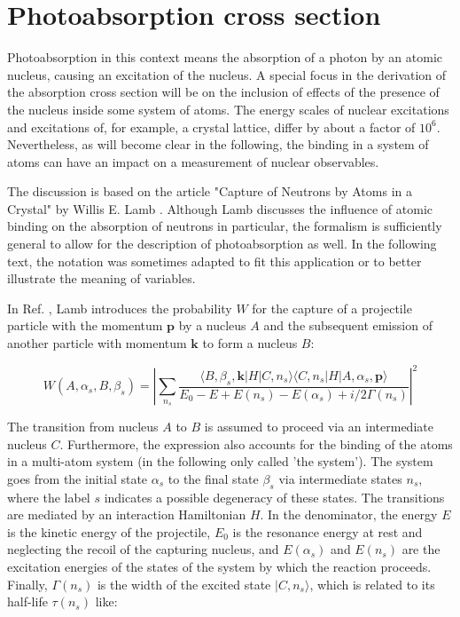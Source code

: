 \documentclass{article}
\begin{document}
\section{Photoabsorption cross section}
Photoabsorption in this context means the absorption of a photon by an atomic nucleus, causing an excitation of the nucleus. A special focus in the derivation of the absorption cross section will be on the inclusion of effects of the presence of the nucleus inside some system of atoms. The energy scales of nuclear excitations and excitations of, for example, a crystal lattice, differ by about a factor of $10^6$. Nevertheless, as will become clear in the following, the binding in a system of atoms can have an impact on a measurement of nuclear observables.

The discussion is based on the article "Capture of Neutrons by Atoms in a Crystal" by Willis E. Lamb \cite{Lam39}. 
Although Lamb discusses the influence of atomic binding on the absorption of neutrons in particular, the formalism is sufficiently general to allow for the description of photoabsorption as well. In the following text, the notation was sometimes adapted to fit this application or to better illustrate the meaning of variables.

In Ref. \cite{Lam39}, Lamb introduces the probability $W$ for the capture of a projectile particle with the momentum $\mathbf{p}$ by a nucleus $A$ and the subsequent emission of another particle with momentum $\mathbf{k}$ to form a nucleus $B$:

\begin{equation}
\label{absorption_general}
W(A, \alpha_s, B, \beta_s) = \left| \sum_{n_s} \frac{\langle B, \beta_s, \mathbf{k} | H | C, n_s \rangle \langle C, n_s | H | A, \alpha_s, \mathbf{p} \rangle }{E_0 - E + E(n_s) - E(\alpha_s) + i/2 \Gamma(n_s)} \right| ^2
\end{equation}

The transition from nucleus $A$ to $B$ is assumed to proceed via an intermediate nucleus $C$. 
Furthermore, the expression also accounts for the binding of the atoms in a multi-atom system (in the following only called 'the system'). 
The system goes from the initial state $\alpha_s$ to the final state $\beta_s$ via intermediate states $n_s$, where the label $s$ indicates a possible degeneracy of these states. 
The transitions are mediated by an interaction Hamiltonian $H$.
In the denominator, the energy $E$ is the kinetic energy of the projectile, $E_0$ is the resonance energy at rest and neglecting the recoil of the capturing nucleus, and $E(\alpha_s)$ and $E(n_s)$ are the excitation energies of the states of the system by which the reaction proceeds.
Finally, $\Gamma(n_s)$ is the width of the excited state $| C, n_s \rangle$, which is related to its half-life $\tau(n_s)$ like:
\end{document}
